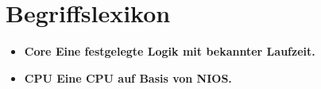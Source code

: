 \newcommand{\begriff}[2]
{\item \bfseries{#1} \textnormal{#2}}

\chapter{Begriffslexikon}
\begin{itemize}

\begriff{Core}{Eine festgelegte Logik mit bekannter Laufzeit.}

\begriff{CPU}{Eine CPU auf Basis von NIOS.}

\end{itemize}

